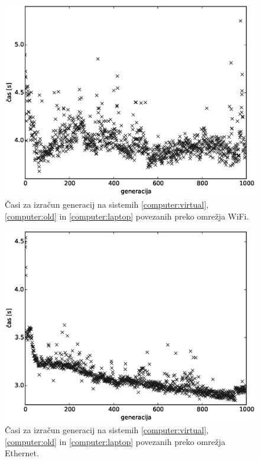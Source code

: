 \documentclass[a4paper,12pt]{book}
\begin{document}
\begin{figure}
	\centering
	\includegraphics[scale=0.5]{res/generation-time-three-wifi.eps}
	\caption{Časi za izračun generacij na sistemih \ref{computer:virtual}, \ref{computer:old} in \ref{computer:laptop} povezanih preko omrežja WiFi. }
	\label{pic:generation-time-wifi}
\end{figure}
\begin{figure}
	\centering
	\includegraphics[scale=0.5]{res/generation-time-three-eth.eps}
	\caption{Časi za izračun generacij na sistemih \ref{computer:virtual}, \ref{computer:old} in \ref{computer:laptop} povezanih preko omrežja Ethernet. }
	\label{pic:generation-time-eth}
\end{figure}
\end{document}
